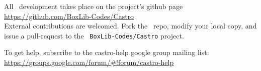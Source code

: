 All \castro\ development takes place on the project's github page\\[0.5em]
\url{https://github.com/BoxLib-Codes/Castro}\\[0.5em]
External contributions are welcomed.  Fork the \castro\ repo, modify
your local copy, and issue a pull-request to the {\tt
BoxLib-Codes/Castro} project.

To get help, subscribe to the castro-help google group mailing list:
\url{https://groups.google.com/forum/#!forum/castro-help}

